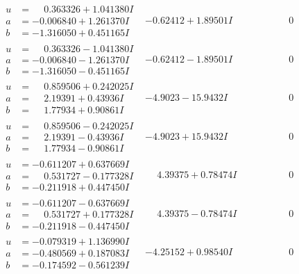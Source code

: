 \documentclass[1p]{elsarticle_modified}
\theoremstyle{definition}
\begin{document}
$$\begin{array}{c|c|c}
\begin{aligned}
u &= \phantom{-}0.363326 + 1.041380 I \\
a &= -0.006840 + 1.261370 I \\
b &= -1.316050 + 0.451165 I\end{aligned}
 & -0.62412 + 1.89501 I & \phantom{-0.000000 } 0 \\ \hline\begin{aligned}
u &= \phantom{-}0.363326 - 1.041380 I \\
a &= -0.006840 - 1.261370 I \\
b &= -1.316050 - 0.451165 I\end{aligned}
 & -0.62412 - 1.89501 I & \phantom{-0.000000 } 0 \\ \hline\begin{aligned}
u &= \phantom{-}0.859506 + 0.242025 I \\
a &= \phantom{-}2.19391 + 0.43936 I \\
b &= \phantom{-}1.77934 + 0.90861 I\end{aligned}
 & -4.9023 - 15.9432 I & \phantom{-0.000000 } 0 \\ \hline\begin{aligned}
u &= \phantom{-}0.859506 - 0.242025 I \\
a &= \phantom{-}2.19391 - 0.43936 I \\
b &= \phantom{-}1.77934 - 0.90861 I\end{aligned}
 & -4.9023 + 15.9432 I & \phantom{-0.000000 } 0 \\ \hline\begin{aligned}
u &= -0.611207 + 0.637669 I \\
a &= \phantom{-}0.531727 - 0.177328 I \\
b &= -0.211918 + 0.447450 I\end{aligned}
 & \phantom{-}4.39375 + 0.78474 I & \phantom{-0.000000 } 0 \\ \hline\begin{aligned}
u &= -0.611207 - 0.637669 I \\
a &= \phantom{-}0.531727 + 0.177328 I \\
b &= -0.211918 - 0.447450 I\end{aligned}
 & \phantom{-}4.39375 - 0.78474 I & \phantom{-0.000000 } 0 \\ \hline\begin{aligned}
u &= -0.079319 + 1.136990 I \\
a &= -0.480569 + 0.187083 I \\
b &= -0.174592 - 0.561239 I\end{aligned}
 & -4.25152 + 0.98540 I & \phantom{-0.000000 } 0 \\ \hline\begin{aligned}

\end{aligned}
\end{array}$$
\end{document}
